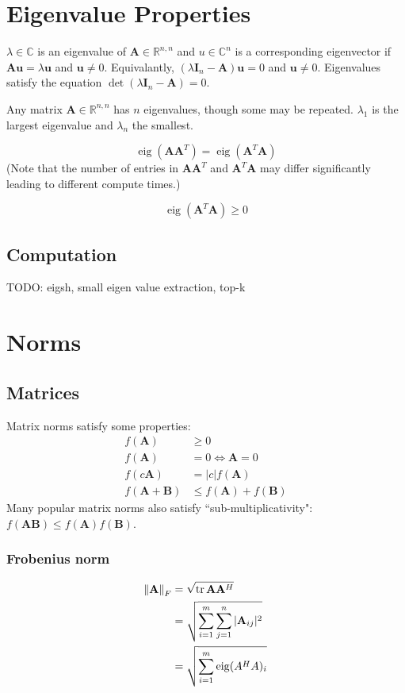 \documentclass{book}
\newcommand{\mA}{\mathbf{A}}
\newcommand{\mB}{\mathbf{B}}
\newcommand{\mI}{\mathbf{I}}
\newcommand{\vu}{\mathbf{u}}
\DeclareMathOperator{\eig}{eig}
\DeclareMathOperator{\trace}{tr}
\newcommand{\sRnn}{\mathbb{R}^{n,n}}
\begin{document}
\chapter{Eigenvalue Properties}

$\lambda\in\mathbb{C}$ is an eigenvalue of $\mA\in\sRnn$ and $u\in\mathbb{C}^n$ is a corresponding eigenvector if $\mA\vu=\lambda\vu$ and $\vu\ne0$. Equivalantly, $(\lambda \mI_n-\mA)\vu=0$ and $\vu\ne0$. Eigenvalues satisfy the equation $\det(\lambda\mI_n-\mA)=0$.

Any matrix $\mA\in\sRnn$ has $n$ eigenvalues, though some may be repeated. $\lambda_1$ is the largest eigenvalue and $\lambda_n$ the smallest.

\begin{equation}
\eig(\mA\mA^T)=\eig(\mA^T\mA)
\end{equation}
(Note that the number of entries in $\mA\mA^T$ and $\mA^T\mA$ may differ significantly leading to different compute times.)

\begin{equation}
\eig(\mA^T\mA)\ge0
\end{equation}

\section*{Computation}

TODO: eigsh, small eigen value extraction, top-k







\chapter{Norms}

\section{Matrices}
Matrix norms satisfy some properties:
\begin{align}
f(\mA)    &\ge 0             \\
f(\mA)    &=   0  \iff \mA=0 \\
f(c\mA)   &=   |c|f(\mA)     \\
f(\mA+\mB)&\le f(\mA)+f(\mB)
\end{align}
Many popular matrix norms also satisfy ``sub-multiplicativity": $f(\mA\mB)\le f(\mA)f(\mB)$.

\subsection{Frobenius norm}
\begin{align}
\norm{\mA}_F &= \sqrt{\trace\mA\mA^H}                           \\
             &= \sqrt{\sum_{i=1}^m \sum_{j=1}^n |\mA_{ij}|^2 }  \\
             &= \sqrt{\sum_{i=1}^m \eig(A^H A)_i }
\end{align}
\end{document}
